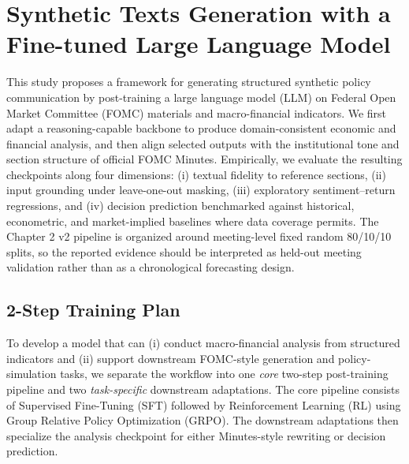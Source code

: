 \graphicspath{{Chapter2/Chapter2Figs/}{Chapter2/Chapter2Figs/}}
 
\chapter{Synthetic Texts Generation with a Fine-tuned Large Language Model}\label{ch:chapter:2}



\begin{Abstract}
This study proposes a framework for generating structured synthetic policy communication by post-training a large language model (LLM) on Federal Open Market Committee (FOMC) materials and macro-financial indicators. We first adapt a reasoning-capable backbone to produce domain-consistent economic and financial analysis, and then align selected outputs with the institutional tone and section structure of official FOMC Minutes. Empirically, we evaluate the resulting checkpoints along four dimensions: (i) textual fidelity to reference sections, (ii) input grounding under leave-one-out masking, (iii) exploratory sentiment--return regressions, and (iv) decision prediction benchmarked against historical, econometric, and market-implied baselines where data coverage permits. The Chapter 2 v2 pipeline is organized around meeting-level fixed random 80/10/10 splits, so the reported evidence should be interpreted as held-out meeting validation rather than as a chronological forecasting design.
\end{Abstract}









\section{2-Step Training Plan}\label{ch2:sec:2-step-training}

To develop a model that can (i) conduct macro-financial analysis from structured indicators and (ii) support downstream FOMC-style generation and policy-simulation tasks, we separate the workflow into one \textit{core} two-step post-training pipeline and two \textit{task-specific} downstream adaptations. The core pipeline consists of Supervised Fine-Tuning (SFT) followed by Reinforcement Learning (RL) using Group Relative Policy Optimization (GRPO). The downstream adaptations then specialize the analysis checkpoint for either Minutes-style rewriting or decision prediction.

